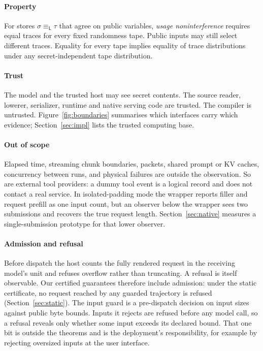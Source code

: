 \documentclass[preprint,12pt]{elsarticle}
\theoremstyle{definition}
\newcommand{\lo}{\mathsf{L}}\newcommand{\hi}{\mathsf{H}}
\begin{document}
\paragraph{Property}
For stores $\sigma\equiv_{\lo}\tau$ that agree on public variables, \emph{usage
noninterference} requires equal traces for every fixed randomness tape. Public
inputs may still select different traces. Equality for every tape implies
equality of trace distributions under any secret-independent tape distribution.

\paragraph{Trust}
The model and the trusted host may see secret contents. The source reader,
lowerer, serializer, runtime and native serving code are trusted. The compiler is
untrusted. Figure~\ref{fig:boundaries} summarises which interfaces carry which
evidence; Section~\ref{sec:impl} lists the trusted computing base.

\paragraph{Out of scope}
Elapsed time, streaming chunk boundaries, packets, shared prompt or KV caches,
concurrency between runs, and physical failures are outside the observation. So
are external tool providers: a dummy tool event is a logical record and does not
contact a real service. In isolated-padding mode the wrapper reports filler and
request prefill as one input count, but an observer below the wrapper sees two
submissions and recovers the true request length. Section~\ref{sec:native}
measures a single-submission prototype for that lower observer.

\paragraph{Admission and refusal}
Before dispatch the host counts the fully rendered request in the receiving
model's unit and refuses overflow rather than truncating. A refusal is itself
observable. Our certified guarantees therefore include admission: under the
static certificate, no request reached by any guarded trajectory is refused
(Section~\ref{sec:static}). The input guard is a pre-dispatch decision on input
sizes against public byte bounds. Inputs it rejects are refused before any model
call, so a refusal reveals only whether some input exceeds its declared bound.
That one bit is outside the theorems and is the deployment's responsibility, for
example by rejecting oversized inputs at the user interface.
\end{document}
